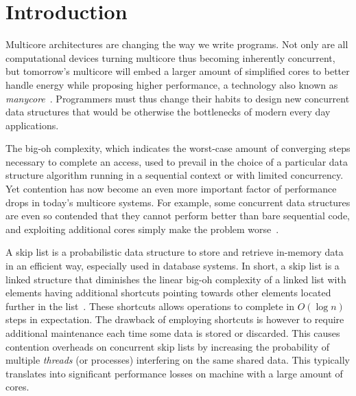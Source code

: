 \section{Introduction}

Multicore architectures are changing the way we write programs.
Not only are all computational devices
turning multicore thus becoming inherently concurrent, 
but tomorrow's multicore will embed a larger amount of simplified cores to better handle energy while 
proposing higher performance, a technology also known as \emph{manycore}~\cite{Borkar2007}.
Programmers must thus change their habits to design new concurrent data structures that would be otherwise the bottlenecks of modern every day applications.

The big-oh complexity, which indicates the worst-case amount of converging steps necessary to 
complete an access, used to prevail in the choice of a particular
data structure algorithm running in a sequential context or with limited concurrency.
Yet contention has now become an even more important factor 
of performance drops in today's multicore systems.
For example, some concurrent data structures are even so contended that they cannot perform 
better than bare sequential code, and exploiting additional cores simply make the problem 
worse~\cite{Sha11}.

A skip list is a probabilistic data structure to store and retrieve in-memory data in an efficient way, 
especially used in database systems.
In short, a skip list is a linked structure that diminishes the linear big-oh complexity
of a linked list with elements having additional shortcuts pointing towards other elements 
located further in the list~\cite{Pug90}. 
These shortcuts allows operations to complete in $O(\log{n})$ steps in expectation.
%
The drawback of employing shortcuts is however to require additional 
maintenance each time some data is stored or discarded.
This causes contention overheads on concurrent skip lists by increasing the probability 
of multiple \emph{threads} (or processes) interfering on the same shared data.
This typically translates into significant performance losses on machine with a 
large amount of cores.

